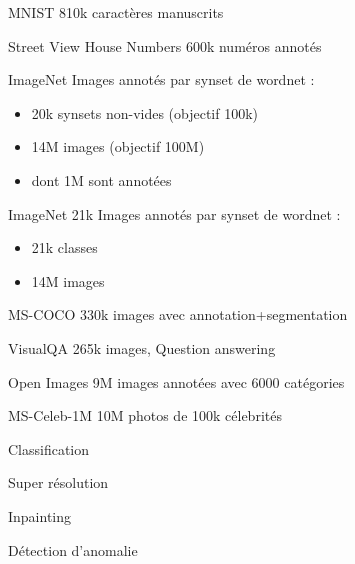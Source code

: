 \begin{frame}{MNIST}
  810k caractères manuscrits
\end{frame}

\begin{frame}{Street View House Numbers}
  600k numéros annotés
\end{frame}

\begin{frame}{ImageNet}
  Images annotés par synset de wordnet :
  \begin{itemize}
    \item 20k synsets non-vides (objectif 100k)
    \item 14M images (objectif 100M)
    \item dont 1M sont annotées
  \end{itemize}
\end{frame}

\begin{frame}{ImageNet 21k}
  Images annotés par synset de wordnet :
  \begin{itemize}
    \item 21k classes
    \item 14M images
  \end{itemize}
\end{frame}

\begin{frame}{MS-COCO}
   330k images avec annotation+segmentation
\end{frame}

\begin{frame}{VisualQA}
  265k images, Question answering
\end{frame}

\begin{frame}{Open Images}
  9M images annotées avec 6000 catégories
\end{frame}

\begin{frame}{MS-Celeb-1M}
  10M photos de 100k célebrités
\end{frame}

\begin{frame}{Classification}
\end{frame}

\begin{frame}{Super résolution}
\end{frame}

\begin{frame}{Inpainting}
\end{frame}

\begin{frame}{Détection d'anomalie}
\end{frame}
